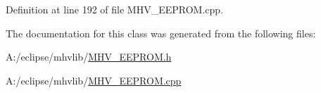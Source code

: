 Definition at line 192 of file M\-H\-V\-\_\-\-E\-E\-P\-R\-O\-M.\-cpp.



The documentation for this class was generated from the following files\-:\begin{DoxyCompactItemize}
\item 
A\-:/eclipse/mhvlib/\hyperlink{_m_h_v___e_e_p_r_o_m_8h}{M\-H\-V\-\_\-\-E\-E\-P\-R\-O\-M.\-h}\item 
A\-:/eclipse/mhvlib/\hyperlink{_m_h_v___e_e_p_r_o_m_8cpp}{M\-H\-V\-\_\-\-E\-E\-P\-R\-O\-M.\-cpp}\end{DoxyCompactItemize}
